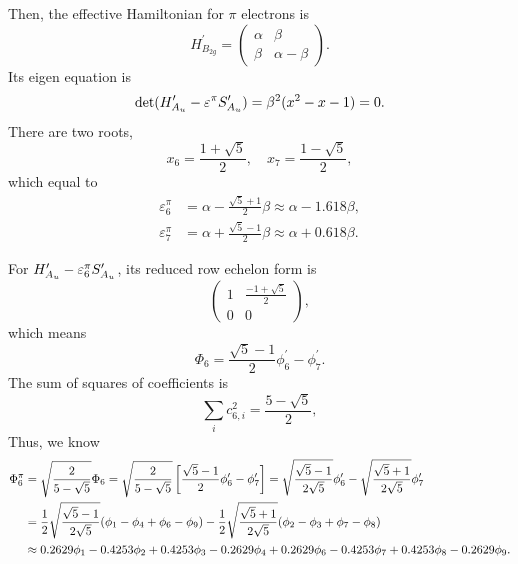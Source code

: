 		Then, the effective Hamiltonian for $\pi$ electrons is
		\begin{equation*}
			H^\prime_{B_{2g}} = \begin{pmatrix}
				\alpha	&	\beta	\\
				\beta	&	\alpha-\beta
				\end{pmatrix}.				
		\end{equation*}
		Its eigen equation is		
		\begin{equation}
			\det(H^\prime_{A_u}-\varepsilon^\pi S^\prime_{A_u}) = \beta^2 ( x^2 - x - 1 ) = 0.
		\end{equation}
		There are two roots,
		\begin{equation}
			x_6 = \frac{1+\sqrt{5}}{2}, \quad x_7 = \frac{1-\sqrt{5}}{2},
		\end{equation}
		which equal to
		\begin{align}
			\varepsilon^\pi_6 &= \alpha - \frac{\sqrt{5}+1}{2}\beta \approx \alpha - 1.618 \beta, \\
			\varepsilon^\pi_7 &= \alpha + \frac{\sqrt{5}-1}{2}\beta \approx \alpha + 0.618 \beta.
		\end{align}
		
		For $H^\prime_{A_u}-\varepsilon^\pi_6 S^\prime_{A_u}$, its reduced row echelon form is
		\begin{equation*}
			\begin{pmatrix}
				1	& \frac{-1+\sqrt{5}}{2}	\\	0	&	0
			\end{pmatrix},
		\end{equation*}
		which means
		\begin{equation*}
			\Phi_6 = \frac{\sqrt{5}-1}{2}\phi^\prime_6 - \phi^\prime_7.
		\end{equation*}
		The sum of squares of coefficients is
		\begin{equation*}
			\sum_{i} c^2_{6,i} = \frac{ 5-\sqrt{5} }{2},
		\end{equation*}
		Thus, we know
		\begin{align}
			\Phi^\pi_6 &= \sqrt{ \frac{2}{5-\sqrt{5}} } \Phi_6 = \sqrt{ \frac{2}{5-\sqrt{5}} } \left[ \frac{\sqrt{5}-1}{2}\phi^\prime_6 - \phi^\prime_7 \right] = \sqrt{\frac{\sqrt{5}-1}{2\sqrt{5}}} \phi^\prime_6 - \sqrt{\frac{\sqrt{5}+1}{2\sqrt{5}}} \phi^\prime_7	\notag \\
			&= \frac{1}{2}\sqrt{\frac{\sqrt{5}-1}{2\sqrt{5}}} (\phi_1 - \phi_4 + \phi_6 - \phi_9) - \frac 12 \sqrt{\frac{\sqrt{5}+1}{2\sqrt{5}}} (\phi_2 - \phi_3 + \phi_7 - \phi_8)\notag \\
			&\approx 0.2629 \phi_1 - 0.4253 \phi_2 + 0.4253 \phi_3 -0.2629 \phi_4 + 0.2629 \phi_6 - 0.4253 \phi_7 + 0.4253\phi_8 - 0.2629 \phi_9.
		\end{align}
		
